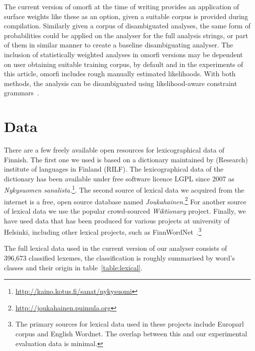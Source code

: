 \documentclass[a4paper,12pt]{article}
\begin{document}
The current version of omorfi at the time of writing provides an application
of surface weights like these as an option, given a suitable corpus is
provided during compilation. Similarly given a corpus of disambiguated
analyses, the same form of probabilities could be applied on the analyser
for the full analysis strings, or part of them in similar manner to create a
baseline disambiguating analyser. The inclusion of statistically weighted
analyses in omorfi versions may be dependent on user obtaining suitable
training corpus, by default and in the experiments of this article, omorfi
includes rough manually estimated likelihoods. With both methods, the
analysis can be disambiguated using likelihood-aware constraint
grammars~\cite{pirinen2014}.

\section{Data}
\label{sec:data}

There are a few freely available open resources for lexicographical data of
Finnish. The first one  we used is based on a dictionary maintained by
(Research) institute of languages in Finland (RILF). The lexicographical data
of the dictionary has been available under free software licence LGPL since
2007 as \textit{Nykysuomen
sanalista.}\footnote{\url{http://kaino.kotus.fi/sanat/nykysuomi}}.  The second
source of lexical data we acquired from the internet is a free, open source
database named
\textit{Joukahainen.}\footnote{\url{http://joukahainen.puimula.org}}  For another
source of lexical data we use the popular crowd-sourced \textit{Wiktionary}
project.  Finally, we have used data that has been produced for various
projects at university of Helsinki, including other lexical projects, such as
FinnWordNet~\citep{linden2010finnwordnet}.\footnote{The primary sources for
lexical data used in these projects include Europarl corpus and English
Wordnet.  The overlap between this and our experimental evaluation data is
minimal.} 

The full lexical data used in the current version of our analyser consists of
396,673 classified lexemes, the classification is roughly summarised by word's
classes and their origin in table~\ref{table:lexical}. 
\end{document}
